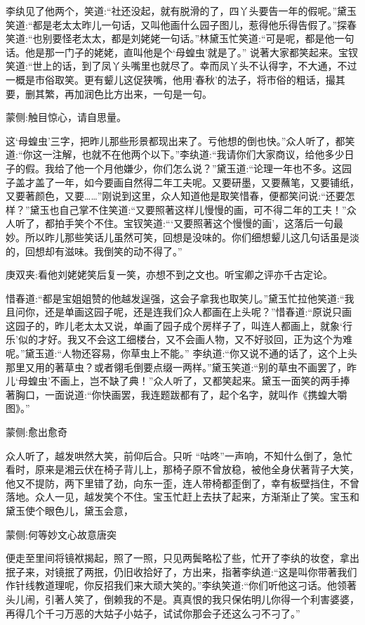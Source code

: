 \begin{parag}
    李纨见了他两个，笑道:“社还没起，就有脱滑的了，四丫头要告一年的假呢。”黛玉笑道:“都是老太太昨儿一句话，又叫他画什么园子图儿，惹得他乐得告假了。”探春笑道:“也别要怪老太太，都是刘姥姥一句话。”林黛玉忙笑道:“可是呢，都是他一句话。他是那一门子的姥姥，直叫他是个‘母蝗虫’就是了。” 说著大家都笑起来。宝钗笑道:“世上的话，到了凤丫头嘴里也就尽了。幸而凤丫头不认得字，不大通，不过一概是市俗取笑。更有颦儿这促狭嘴，他用‘春秋’的法子，将市俗的粗话，撮其要，删其繁，再加润色比方出来，一句是一句。\begin{note}蒙侧:触目惊心，请自思量。\end{note}这‘母蝗虫’三字，把昨儿那些形景都现出来了。亏他想的倒也快。”众人听了，都笑道:“你这一注解，也就不在他两个以下。”李纨道:“我请你们大家商议，给他多少日子的假。我给了他一个月他嫌少，你们怎么说？”黛玉道:“论理一年也不多。这园子盖才盖了一年，如今要画自然得二年工夫呢。又要研墨，又要蘸笔，又要铺纸，又要著颜色，又要……”刚说到这里，众人知道他是取笑惜春，便都笑问说:“还要怎样？”黛玉也自己掌不住笑道:“又要照著这样儿慢慢的画，可不得二年的工夫！”众人听了，都拍手笑个不住。宝钗笑道:“‘又要照著这个慢慢的画’，这落后一句最妙。所以昨儿那些笑话儿虽然可笑，回想是没味的。你们细想颦儿这几句话虽是淡的，回想却有滋味。我倒笑的动不得了。”\begin{note}庚双夹:看他刘姥姥笑后复一笑，亦想不到之文也。听宝卿之评亦千古定论。\end{note}惜春道:“都是宝姐姐赞的他越发逞强，这会子拿我也取笑儿。”黛玉忙拉他笑道:“我且问你，还是单画这园子呢，还是连我们众人都画在上头呢？”惜春道:“原说只画这园子的，昨儿老太太又说，单画了园子成个房样子了，叫连人都画上，就象‘行乐’似的才好。我又不会这工细楼台，又不会画人物，又不好驳回，正为这个为难呢。”黛玉道:“人物还容易，你草虫上不能。” 李纨道:“你又说不通的话了，这个上头那里又用的著草虫？或者翎毛倒要点缀一两样。”黛玉笑道:“别的草虫不画罢了，昨儿‘母蝗虫’不画上，岂不缺了典！”众人听了，又都笑起来。黛玉一面笑的两手捧著胸口，一面说道:“你快画罢，我连题跋都有了，起个名字，就叫作《携蝗大嚼图》。”\begin{note}蒙侧:愈出愈奇\end{note}众人听了，越发哄然大笑，前仰后合。只听 “咕咚”一声响，不知什么倒了，急忙看时，原来是湘云伏在椅子背儿上，那椅子原不曾放稳，被他全身伏著背子大笑，他又不提防，两下里错了劲，向东一歪，连人带椅都歪倒了，幸有板壁挡住，不曾落地。众人一见，越发笑个不住。宝玉忙赶上去扶了起来，方渐渐止了笑。宝玉和黛玉使个眼色儿，黛玉会意，\begin{note}蒙侧:何等妙文心故意唐突\end{note}便走至里间将镜袱揭起，照了一照，只见两鬓略松了些，忙开了李纨的妆奁，拿出抿子来，对镜抿了两抿，仍旧收拾好了，方出来，指著李纨道:“这是叫你带著我们作针线教道理呢，你反招我们来大顽大笑的。”李纨笑道:“你们听他这刁话。他领著头儿闹，引著人笑了，倒赖我的不是。真真恨的我只保佑明儿你得一个利害婆婆，再得几个千刁万恶的大姑子小姑子，试试你那会子还这么刁不刁了。”
\end{parag}


